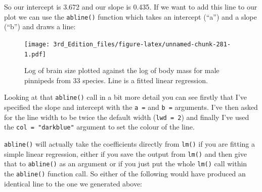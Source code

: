 \documentclass[
]{book}
\newenvironment{Shaded}{\begin{snugshade}}{\end{snugshade}}
\newcommand{\DataTypeTok}[1]{\textcolor[rgb]{0.13,0.29,0.53}{#1}}
\newcommand{\DecValTok}[1]{\textcolor[rgb]{0.00,0.00,0.81}{#1}}
\newcommand{\FloatTok}[1]{\textcolor[rgb]{0.00,0.00,0.81}{#1}}
\newcommand{\KeywordTok}[1]{\textcolor[rgb]{0.13,0.29,0.53}{\textbf{#1}}}
\newcommand{\NormalTok}[1]{#1}
\newcommand{\OperatorTok}[1]{\textcolor[rgb]{0.81,0.36,0.00}{\textbf{#1}}}
\newcommand{\StringTok}[1]{\textcolor[rgb]{0.31,0.60,0.02}{#1}}
\begin{document}
So our intercept is 3.672 and our slope is 0.435. If we want to add this line to our plot we can use the \texttt{abline()} function which takes an intercept (``a'') and a slope (``b'') and draws a line:

\begin{Shaded}
\end{Shaded}

\begin{figure}
\centering
\texttt{[image: 3rd\_Edition\_files/figure-latex/unnamed-chunk-281-1.pdf]}
\caption{\label{fig:unnamed-chunk-281}Log of brain size plotted against the log of body mass for male pinnipeds from 33 species. Line is a fitted linear regression.}
\end{figure}

Looking at that \texttt{abline()} call in a bit more detail you can see firstly that I've specified the slope and intercept with the \texttt{a\ =} and \texttt{b\ =} arguments. I've then asked for the line width to be twice the default width (\texttt{lwd\ =\ 2}) and finally I've used the \texttt{col\ =\ "darkblue"} argument to set the colour of the line.

\texttt{abline()} will actually take the coefficients directly from \texttt{lm()} if you are fitting a simple linear regression, either if you save the output from \texttt{lm()} and then give that to \texttt{abline()} as an argument or if you just put the whole \texttt{lm()} call within the \texttt{abline()} function call. So either of the following would have produced an identical line to the one we generated above:
\end{document}
